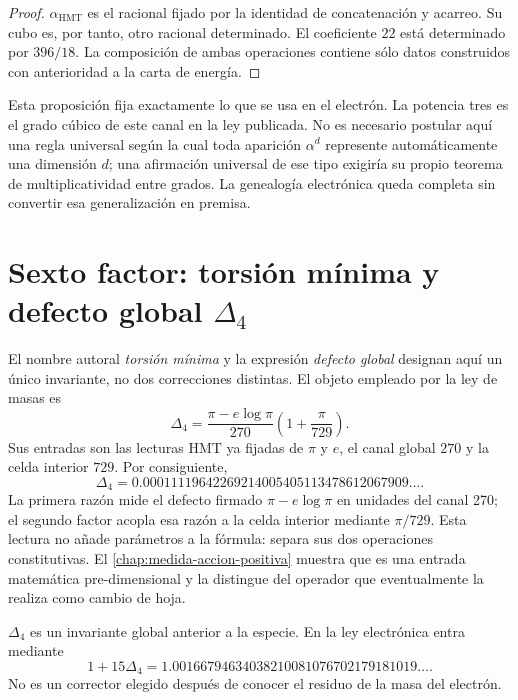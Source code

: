 \begin{proof}
\(\alpha_{\mathrm{HMT}}\) es el racional fijado por la identidad de
concatenación y acarreo. Su cubo es, por tanto, otro racional determinado.
El coeficiente \(22\) está determinado por \(396/18\). La composición de
ambas operaciones contiene sólo datos construidos con anterioridad a la
carta de energía.
\end{proof}

Esta proposición fija exactamente lo que se usa en el electrón. La potencia
tres es el grado cúbico de este canal en la ley publicada. No es necesario
postular aquí una regla universal según la cual toda aparición
\(\alpha^d\) represente automáticamente una dimensión \(d\); una
afirmación universal de ese tipo exigiría su propio teorema de
multiplicatividad entre grados. La genealogía electrónica queda completa
sin convertir esa generalización en premisa.

\section{Sexto factor: torsión mínima y defecto global
\texorpdfstring{\(\Delta_4\)}{Delta 4}}

El nombre autoral \emph{torsión mínima} y la expresión \emph{defecto global}
designan aquí un único invariante, no dos correcciones distintas. El objeto
empleado por la ley de masas es
\begin{equation}
 \label{eq:delta4-electron-rev6}
 \boxed{
 \Delta_4
 =
 \frac{\pi-e\log\pi}{270}
 \left(1+\frac{\pi}{729}\right).}
\end{equation}
Sus entradas son las lecturas HMT ya fijadas de \(\pi\) y \(e\), el canal
global \(270\) y la celda interior \(729\). Por consiguiente,
\[
 \Delta_4
 =
 0.00011119642269214005405113478612067909\ldots.
\]
La primera razón mide el defecto firmado
\(\pi-e\log\pi\) en unidades del canal 270; el segundo factor acopla esa
razón a la celda interior mediante \(\pi/729\). Esta lectura no añade
parámetros a la fórmula: separa sus dos operaciones constitutivas.
El \cref{chap:medida-accion-positiva} muestra que es una entrada matemática
pre-dimensional y la distingue del operador que eventualmente la realiza
como cambio de hoja.

\begin{proposition}
\label{prop:delta4-global-electron-rev6}
\(\Delta_4\) es un invariante global anterior a la especie. En la ley
electrónica entra mediante
\[
 1+15\Delta_4
 =
 1.00166794634038210081076702179181019\ldots.
\]
No es un corrector elegido después de conocer el residuo de la masa del
electrón.
\end{proposition}

